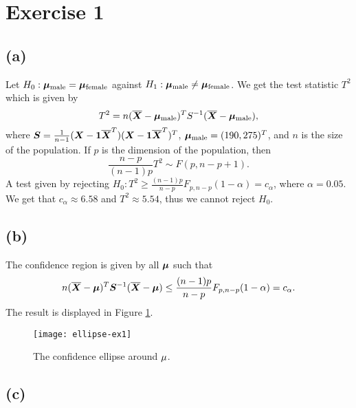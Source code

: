 \section*{Exercise 1}

\subsection*{(a)}
\label{sec:a}

Let $H_0: \bm{\mu}_{\rm  male} = \bm{\mu}_{\rm female}$ against $H_{1}: \bm{\mu}_{\rm
  male} \neq \bm{\mu}_{\rm female}$.
We get the test statistic $T^{2}$ which is given by
\begin{equation*}
  T^{2} = n(\overline{\bm{X}} - \bm{\mu}_{\rm male})^{T} S^{-1}(\overline{\bm{X}} - \bm{\mu}_{\rm male}),
\end{equation*}
where $\bm{S} = \frac{1}{n-1}(\bm{X} - \bm{1}\overline{\bm{X}}^{T})(\bm{X} - \bm{1}\overline{\bm{X}}^{T})^{T}$, $\bm{\mu}_{\rm male} = (190, 275)^{T}$, and $n$ is the size
of the population. If $p$ is the dimension of the population, then 
\begin{equation*}
  \frac{n-p}{(n-1)p}T^{2} \sim F(p,n-p+1).
\end{equation*}
A test given by rejecting $H_{0}: T^{2} \geq \frac{(n-1)p}{n-p}F_{p,
  n-p}(1 -\alpha) = c_{\alpha}$, where $\alpha = 0.05$. We get that
$c_{\alpha} \approx 6.58$ and $T^{2} \approx 5.54
$, thus we cannot reject $H_{0}$.


\subsection*{(b)}
\label{sec:b}

The confidence region is given by all $\bm{\mu}$ such that
\begin{equation*}
  n(\overline{\bm{X}} - \bm{\mu})^{T}\bm{S}^{-1}(\overline{\bm{X}} - \bm{\mu}) \leq \frac{(n-1)p}{n-p}F_{p,
  n-p}(1 -\alpha) = c_{\alpha}.
\end{equation*}
The result is displayed in Figure \ref{fig:ex1-ellipse}.
\begin{figure}[h]
  \centering
  \texttt{[image: ellipse-ex1]}
  \caption{The confidence ellipse around ${\bf \mu}$.}
  \label{fig:ex1-ellipse}
\end{figure}

\subsection*{(c)}
\label{sec:c}

